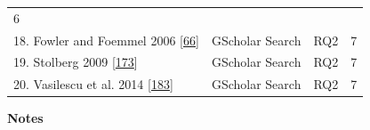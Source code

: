 \documentclass[]{book}
\begin{document}
\begin{longtable}[]{@{}llll@{}}
\begin{minipage}[t]{0.06\columnwidth}
6\strut
\end{minipage}\tabularnewline
\begin{minipage}[t]{0.48\columnwidth}\raggedright\strut
18. Fowler and Foemmel 2006
{[}\protect\hyperlink{ref-fowler2006continuous}{66}{]}\strut
\end{minipage} & \begin{minipage}[t]{0.20\columnwidth}\raggedright\strut
GScholar Search\strut
\end{minipage} & \begin{minipage}[t]{0.14\columnwidth}\raggedright\strut
RQ2\strut
\end{minipage} & \begin{minipage}[t]{0.06\columnwidth}\raggedright\strut
7\strut
\end{minipage}\tabularnewline
\begin{minipage}[t]{0.48\columnwidth}\raggedright\strut
19. Stolberg 2009
{[}\protect\hyperlink{ref-stolberg2009enabling}{173}{]}\strut
\end{minipage} & \begin{minipage}[t]{0.20\columnwidth}\raggedright\strut
GScholar Search\strut
\end{minipage} & \begin{minipage}[t]{0.14\columnwidth}\raggedright\strut
RQ2\strut
\end{minipage} & \begin{minipage}[t]{0.06\columnwidth}\raggedright\strut
7\strut
\end{minipage}\tabularnewline
\begin{minipage}[t]{0.48\columnwidth}\raggedright\strut
20. Vasilescu et al. 2014
{[}\protect\hyperlink{ref-vasilescu2014continuous}{183}{]}\strut
\end{minipage} & \begin{minipage}[t]{0.20\columnwidth}\raggedright\strut
GScholar Search\strut
\end{minipage} & \begin{minipage}[t]{0.14\columnwidth}\raggedright\strut
RQ2\strut
\end{minipage} & \begin{minipage}[t]{0.06\columnwidth}\raggedright\strut
7\strut
\end{minipage}\tabularnewline
\bottomrule
\end{longtable}

\textbf{Notes}
\end{document}

